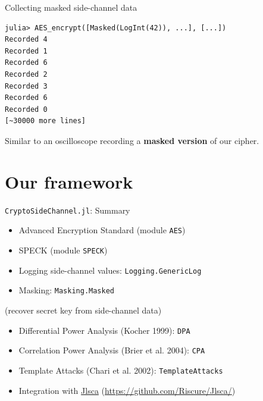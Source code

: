 \begin{frame}[fragile]{Collecting masked side-channel data}

    \begin{verbatim}
julia> AES_encrypt([Masked(LogInt(42)), ...], [...])
Recorded 4
Recorded 1
Recorded 6
Recorded 2
Recorded 3
Recorded 6
Recorded 0
[~30000 more lines]
        \end{verbatim}
\vspace{1em}
Similar to an oscilloscope recording a \textbf{masked version} of our cipher.
\end{frame}

\section*{Our framework}
\begin{frame}[fragile]{\texttt{CryptoSideChannel.jl}: Summary}
    \begin{itemize}
        \item Advanced Encryption Standard (module \texttt{AES})
        \item SPECK (module \texttt{SPECK})
    \end{itemize}

    \begin{itemize}
        \item Logging side-channel values: \texttt{Logging.GenericLog}
        \item Masking: \texttt{Masking.Masked}
    \end{itemize}

     {\scriptsize (recover secret key from side-channel data)}
    \begin{itemize}
        \item Differential Power Analysis {\scriptsize (Kocher 1999)}: \texttt{DPA}
        \item Correlation Power Analysis {\scriptsize (Brier et al. 2004)}: \texttt{CPA}
        \item Template Attacks {\scriptsize (Chari et al. 2002)}: \texttt{TemplateAttacks}
        \item Integration with \url{Jlsca} {\scriptsize (\url{https://github.com/Riscure/Jlsca/})}
    \end{itemize}
    \begin{center}
    \end{center}

\end{frame}


